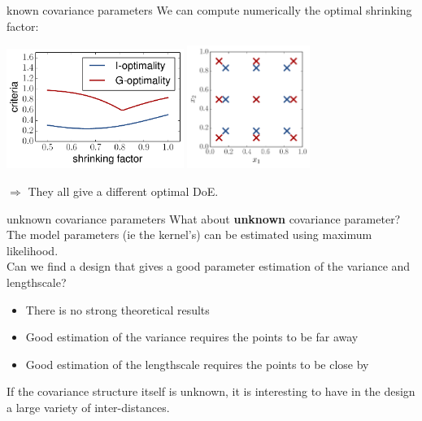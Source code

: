 \documentclass{beamer}
\begin{document}
\begin{frame}{known covariance parameters}
We can compute numerically the optimal shrinking factor:
\vspace{2mm}
\begin{center}
\includegraphics[height=3.9cm]{figures/python/opt_IG} \qquad
\includegraphics[height=4cm]{figures/python/opt_XIG}
\end{center}
\vspace{2mm}
$\Rightarrow$ They all give a different optimal DoE.
\end{frame}

\begin{frame}{unknown covariance parameters}
What about \textbf{unknown} covariance parameter?\\
The model parameters (ie the kernel's) can be estimated using maximum likelihood. \\
\vspace{5mm}
Can we find a design that gives a good parameter estimation of the variance and lengthscale?
\begin{itemize}
	\item There is no strong theoretical results
	\item Good estimation of the variance requires the points to be far away
	\item Good estimation of the lengthscale requires the points to be close by
\end{itemize}
If the covariance structure itself is unknown, it is interesting to have in the design a large variety of inter-distances.
\end{frame}
\end{document}
